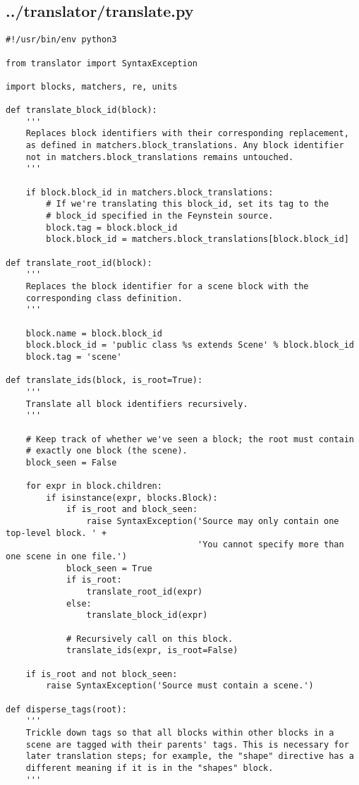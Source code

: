 \subsection*{../translator/translate.py}
\begin{lstlisting}
#!/usr/bin/env python3

from translator import SyntaxException

import blocks, matchers, re, units

def translate_block_id(block):
    '''
    Replaces block identifiers with their corresponding replacement,
    as defined in matchers.block_translations. Any block identifier
    not in matchers.block_translations remains untouched.
    '''

    if block.block_id in matchers.block_translations:
        # If we're translating this block_id, set its tag to the
        # block_id specified in the Feynstein source.
        block.tag = block.block_id
        block.block_id = matchers.block_translations[block.block_id]

def translate_root_id(block):
    '''
    Replaces the block identifier for a scene block with the
    corresponding class definition.
    '''

    block.name = block.block_id
    block.block_id = 'public class %s extends Scene' % block.block_id
    block.tag = 'scene'

def translate_ids(block, is_root=True):
    '''
    Translate all block identifiers recursively.
    '''

    # Keep track of whether we've seen a block; the root must contain
    # exactly one block (the scene).
    block_seen = False

    for expr in block.children:
        if isinstance(expr, blocks.Block):
            if is_root and block_seen:
                raise SyntaxException('Source may only contain one top-level block. ' +
                                      'You cannot specify more than one scene in one file.')
            block_seen = True
            if is_root:
                translate_root_id(expr)
            else:
                translate_block_id(expr)

            # Recursively call on this block.
            translate_ids(expr, is_root=False)

    if is_root and not block_seen:
        raise SyntaxException('Source must contain a scene.')

def disperse_tags(root):
    '''
    Trickle down tags so that all blocks within other blocks in a
    scene are tagged with their parents' tags. This is necessary for
    later translation steps; for example, the "shape" directive has a
    different meaning if it is in the "shapes" block.
    '''


\end{lstlisting}

